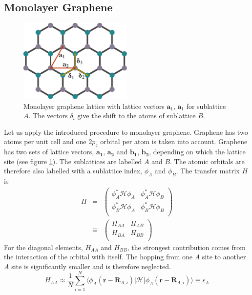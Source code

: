 \subsection{Monolayer Graphene}

\begin{figure}
\centering
\includegraphics[width=0.5\textwidth]{figure/numericalframework/graphene_lattice_single_layer_csch}
\caption{Monolayer graphene lattice with lattice vectors $\mathbf{a}_1$, $\mathbf{a}_1$ for sublattice $A$. The vectors $\delta_i$ give the shift to the atoms of sublattice $B$.} \label{fig:monolayer}
\end{figure}
Let us apply the introduced procedure to monolayer graphene. Graphene has two atoms per unit cell and  one $2p_z$ orbital per atom is taken into account. Graphene has two sets of lattice vectors, $\mathbf{a_1}$, $\mathbf{a_2}$ and $\mathbf{b_1}$, $\mathbf{b_2}$, depending on which the lattice site (see figure \ref{fig:monolayer}). The sublattices are labelled $A$ and $B$. The atomic orbitals are therefore also labelled with a sublattice index, $\phi_A$ and $\phi_B$. The transfer matrix $H$ is
\begin{eqnarray}
H &=& \begin{pmatrix}
\phi_A^* \mathcal{H} \phi_A & \phi_A^* \mathcal{H} \phi_B \\
\phi_B^* \mathcal{H} \phi_A & \phi_B^* \mathcal{H} \phi_B\\
\end{pmatrix} \\
&\equiv& \begin{pmatrix}
H_{A A} & H_{A B} \\
H_{B A} & H_{B B}\\
\end{pmatrix}
\end{eqnarray}
For the diagonal elements, $H_{A A}$ and $H_{B B}$, the strongest contribution comes from the interaction of the orbital with itself. The hopping from one $A$ site to another $A$ site is significantly smaller and is therefore neglected.
\begin{equation}
H_{A A} \approx \frac{1}{N} \sum_{i=1}^N \langle \phi_A ( \mathbf{r} - \mathbf{R}_{A, i} ) | \mathcal{H} |  \phi_A ( \mathbf{r} - \mathbf{R}_{A, i} ) \rangle \equiv \epsilon_A
\end{equation}
